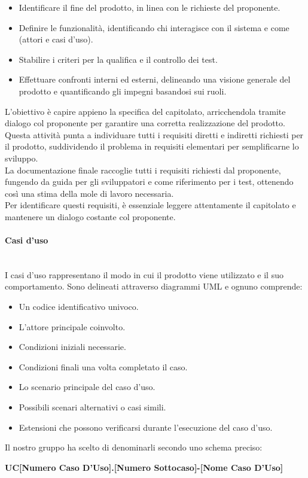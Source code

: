 \documentclass{article}
\begin{document}
\begin{itemize}
    \item Identificare il fine del prodotto, in linea con le richieste del proponente.
    \item Definire le funzionalità, identificando chi interagisce con il sistema e come (attori e casi d'uso).
    \item Stabilire i criteri per la qualifica e il controllo dei test.
    \item Effettuare confronti interni ed esterni, delineando una visione generale del prodotto e quantificando gli impegni basandosi sui ruoli.
\end{itemize}
L'obiettivo è capire appieno la specifica del capitolato, arricchendola tramite dialogo col proponente per garantire una corretta realizzazione del prodotto.\\
Questa attività punta a individuare tutti i requisiti diretti e indiretti richiesti per il prodotto, suddividendo il problema in requisiti elementari per semplificarne lo sviluppo.\\
La documentazione finale raccoglie tutti i requisiti richiesti dal proponente, fungendo da guida per gli sviluppatori e come riferimento per i test, ottenendo così una stima della mole di lavoro necessaria.\\
Per identificare questi requisiti, è essenziale leggere attentamente il capitolato e mantenere un dialogo costante col proponente.\\
\paragraph{Casi d'uso}~\\
I casi d'uso rappresentano il modo in cui il prodotto viene utilizzato e il suo comportamento. Sono delineati attraverso diagrammi UML e ognuno comprende:

\begin{itemize}
    \item Un codice identificativo univoco.
    \item L'attore principale coinvolto.
    \item Condizioni iniziali necessarie.
    \item Condizioni finali una volta completato il caso.
    \item Lo scenario principale del caso d'uso.
    \item Possibili scenari alternativi o casi simili.
    \item Estensioni che possono verificarsi durante l'esecuzione del caso d'uso.
\end{itemize}
Il nostro gruppo ha scelto di denominarli secondo uno schema preciso: 
\begin{center}
    \textbf{UC[Numero Caso D'Uso].[Numero Sottocaso]-[Nome Caso D'Uso]}
\end{center}
\end{document}
